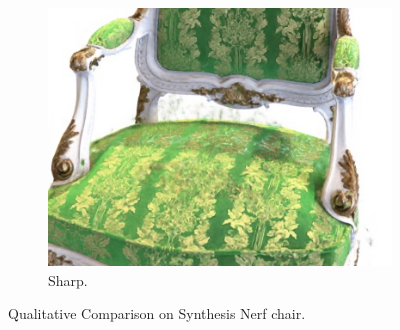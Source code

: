 \begin{figure}[ht!]
\begin{subfigure}{0.19\textwidth}
        \includegraphics[width=\linewidth]{figs/sharpness_chair.jpg}
          \caption{Sharp.}
          \label{fig:sub2}
      \end{subfigure}
  \caption{
  \label{fig:total}
  Qualitative Comparison on Synthesis Nerf chair.
  }
\end{figure}


